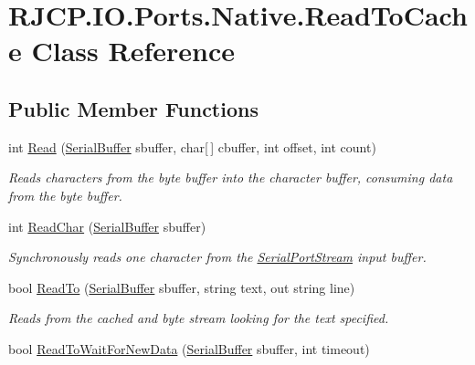 \hypertarget{class_r_j_c_p_1_1_i_o_1_1_ports_1_1_native_1_1_read_to_cache}{}\section{R\+J\+C\+P.\+I\+O.\+Ports.\+Native.\+Read\+To\+Cache Class Reference}
\label{class_r_j_c_p_1_1_i_o_1_1_ports_1_1_native_1_1_read_to_cache}
\subsection*{Public Member Functions}
\begin{DoxyCompactItemize}
\item 
int \mbox{\hyperlink{class_r_j_c_p_1_1_i_o_1_1_ports_1_1_native_1_1_read_to_cache_adf52a6068959c7d847f84941b8adfe16}{Read}} (\mbox{\hyperlink{class_r_j_c_p_1_1_i_o_1_1_ports_1_1_native_1_1_serial_buffer}{Serial\+Buffer}} sbuffer, char\mbox{[}$\,$\mbox{]} cbuffer, int offset, int count)
\begin{DoxyCompactList}\small\item\em Reads characters from the byte buffer into the character buffer, consuming data from the byte buffer. \end{DoxyCompactList}\item 
int \mbox{\hyperlink{class_r_j_c_p_1_1_i_o_1_1_ports_1_1_native_1_1_read_to_cache_acc82ffe4361a14b6206220918cb18ed5}{Read\+Char}} (\mbox{\hyperlink{class_r_j_c_p_1_1_i_o_1_1_ports_1_1_native_1_1_serial_buffer}{Serial\+Buffer}} sbuffer)
\begin{DoxyCompactList}\small\item\em Synchronously reads one character from the \mbox{\hyperlink{class_r_j_c_p_1_1_i_o_1_1_ports_1_1_serial_port_stream}{Serial\+Port\+Stream}} input buffer. \end{DoxyCompactList}\item 
bool \mbox{\hyperlink{class_r_j_c_p_1_1_i_o_1_1_ports_1_1_native_1_1_read_to_cache_a57a77a7d1da2574cb05400c5745613c2}{Read\+To}} (\mbox{\hyperlink{class_r_j_c_p_1_1_i_o_1_1_ports_1_1_native_1_1_serial_buffer}{Serial\+Buffer}} sbuffer, string text, out string line)
\begin{DoxyCompactList}\small\item\em Reads from the cached and byte stream looking for the text specified. \end{DoxyCompactList}\item 
bool \mbox{\hyperlink{class_r_j_c_p_1_1_i_o_1_1_ports_1_1_native_1_1_read_to_cache_adece0a8b0b5c4bc5f33275c93fadc45c}{Read\+To\+Wait\+For\+New\+Data}} (\mbox{\hyperlink{class_r_j_c_p_1_1_i_o_1_1_ports_1_1_native_1_1_serial_buffer}{Serial\+Buffer}} sbuffer, int timeout)

\end{DoxyCompactItemize}
